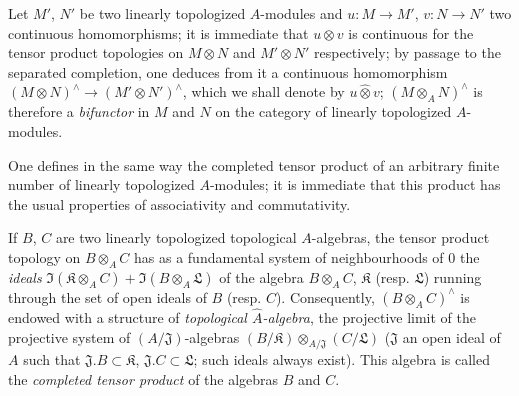 \begin{env}[7.7.3]
\label{0.7.7.3}
Let $M'$, $N'$ be two linearly topologized $A$-modules and
$u:M\to M'$, $v:N\to N'$ two continuous homomorphisms; it is immediate
that $u\otimes v$ is continuous for the tensor product topologies on
$M\otimes N$ and $M'\otimes N'$ respectively; by passage to the separated
completion, one deduces from it a continuous homomorphism
$(M\otimes N)^\wedge\to(M'\otimes N')^\wedge$, which we shall denote
by $u\widehat\otimes v$; $(M\otimes_A N)^\wedge$ is therefore a
\emph{bifunctor} in $M$ and $N$ on the category of linearly topologized
$A$-modules.
\end{env}

\begin{env}[7.7.4]
\label{0.7.7.4}
One defines in the same way the completed tensor product of an arbitrary finite number
of linearly topologized $A$-modules; it is immediate that this product
has the usual properties of associativity and commutativity.
\end{env}

\begin{env}[7.7.5]
\label{0.7.7.5}
If $B$, $C$ are two linearly topologized topological $A$-algebras,
the tensor product topology on $B\otimes_A C$ has as a fundamental system
of neighbourhoods of $0$ the \emph{ideals}
$\Im(\mathfrak K\otimes_A C)+\Im(B\otimes_A\mathfrak L)$ of the algebra
$B\otimes_A C$, $\mathfrak K$ (resp. $\mathfrak L$) running through the set
of open ideals of $B$ (resp. $C$). Consequently, $(B\otimes_A C)^\wedge$
is endowed with a structure of \emph{topological $\widehat A$-algebra}, the projective
limit of the projective system of $(A/\mathfrak J)$-algebras
$(B/\mathfrak K)\otimes_{A/\mathfrak J}(C/\mathfrak L)$ ($\mathfrak J$
an open ideal of $A$ such that $\mathfrak J.B\subset\mathfrak K$,
$\mathfrak J.C\subset\mathfrak L$; such ideals always exist). This
algebra is called the \emph{completed tensor product} of the algebras $B$ and
$C$.
\end{env}

